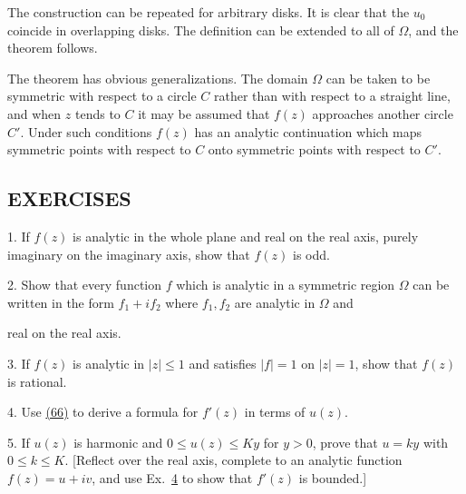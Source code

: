 The construction can be repeated for arbitrary disks. It is clear that the $u_{0}$ coincide in overlapping disks. The definition can be extended to all of $\Omega$, and the theorem follows.

The theorem has obvious generalizations. The domain $\Omega$ can be taken to be symmetric with respect to a circle $C$ rather than with respect to a straight line, and when $z$ tends to $C$ it may be assumed that $f(z)$ approaches another circle $C'$. Under such conditions $f(z)$ has an analytic continuation which maps symmetric points with respect to $C$ onto symmetric points with respect to $C'$.

\subsection*{EXERCISES}
1. If $f(z)$ is analytic in the whole plane and real on the real axis, purely imaginary on the imaginary axis, show that $f(z)$ is odd.

2. Show that every function $f$ which is analytic in a symmetric region $\Omega$ can be written in the form $f_1 + if_2$ where $f_1, f_2$ are analytic in $\Omega$ and


real on the real axis.

3. If $f(z)$ is analytic in $|z| \leq 1$ and satisfies $|f| = 1$ on $|z| = 1$, show that $f(z)$ is rational.

4. Use \hyperref[eq:4.66]{(66)} to derive a formula for $f'(z)$ in terms of $u(z)$.

5. If $u(z)$ is harmonic and $0 \leq u(z) \leq Ky$ for $y > 0$, prove that $u = ky$ with $0 \leq k \leq K$. [Reflect over the real axis, complete to an analytic function $f(z) = u + iv$, and use Ex.~\hyperref[exercise:4.6.5.13.4]{4} to show that $f'(z)$ is bounded.]


